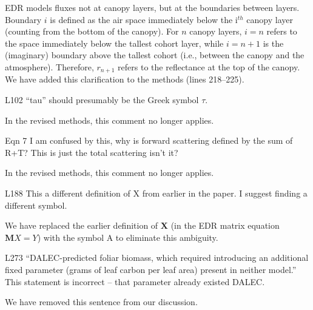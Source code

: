 EDR models fluxes not at canopy layers, but at the boundaries between layers.
Boundary $i$ is defined as the air space immediately below the i$^{th}$ canopy layer (counting from the bottom of the canopy).
For $n$ canopy layers, $i = n$ refers to the space immediately below the tallest cohort layer, while $i = n+1$ is the (imaginary) boundary above the tallest cohort (i.e., between the canopy and the atmosphere).
Therefore, $r_{n+1}$ refers to the reflectance at the top of the canopy.
We have added this clarification to the methods (lines 218--225).

\begin{reviewer}
L102 “tau” should presumably be the Greek symbol $\tau$.
\end{reviewer}

In the revised methods, this comment no longer applies.

\begin{reviewer}
Eqn 7 I am confused by this, why is forward scattering defined by the sum of R+T? This is just the total scattering isn’t it?
\end{reviewer}

In the revised methods, this comment no longer applies.

\begin{reviewer}
L188 This a different definition of X from earlier in the paper. I suggest finding a different symbol.
\end{reviewer}

We have replaced the earlier definition of $\mathbf{X}$ (in the EDR matrix equation $\mathbf{M}{X} = {Y}$) with the symbol A to eliminate this ambiguity.

\begin{reviewer}
L273 “DALEC-predicted foliar biomass, which required introducing an additional fixed parameter (grams of leaf carbon per leaf area) present in neither model.” This statement is incorrect – that parameter already existed DALEC.
\end{reviewer}

We have removed this sentence from our discussion.

